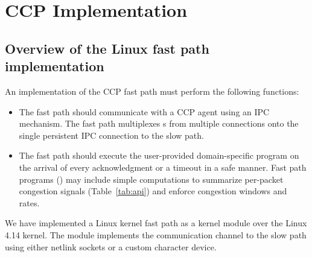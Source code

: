 \section{CCP Implementation}
\label{s:datapath}
%
\subsection{Overview of the Linux fast path implementation}
\label{sec:implementation-basics}

An implementation of the CCP fast path must perform the following functions:
\begin{itemize}
\item The fast path should communicate with a \userspace CCP agent using an IPC
  mechanism. The fast path multiplexes s from multiple connections
  onto the single persistent IPC connection to the slow path.
\item The fast path should execute the user-provided domain-specific program on
  the arrival of every acknowledgment or a timeout in a safe manner. Fast path
  programs () may include simple computations to summarize
  per-packet congestion signals (Table~\ref{tab:api}) and enforce congestion
  windows and rates.
\end{itemize}

We have implemented a Linux kernel fast path as a kernel
module over the Linux 4.14 kernel. The module
implements the communication channel to the slow path using either netlink sockets or a custom
character device.

